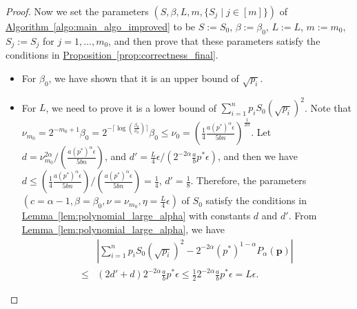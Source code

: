 \documentclass[journal]{IEEEtran}
\newcommand{\lem}[1]{\hyperref[lem:#1]{Lemma~\ref*{lem:#1}}}
\newcommand{\prop}[1]{\hyperref[prop:#1]{Proposition~\ref*{prop:#1}}}
\newcommand{\algo}[1]{\hyperref[algo:#1]{Algorithm~\ref*{algo:#1}}}
\begin{document}
\begin{proof}
    Now we set the parameters $(S, \beta,L,m,\{S_j\mid j\in[m]\})$ of \algo{main_algo_improved} to be $S:=S_0$, $\beta := \beta_0$, $L:=L$, $m:=m_0$, $S_j := S_j$ for $j = 1,\ldots,m_0$, and then prove that these parameters satisfy the conditions in \prop{correctness_final}.
    \begin{itemize}
        \item For $\beta_0$, we have shown that it is an upper bound of $\sqrt{p_i}$.
        \item For $L$, we need to prove it is a lower bound of $\sum_{i=1}^n p_i S_0(\sqrt{p_i})^2$. Note that $\nu_{m_0} = 2^{-m_0+1}\beta_0 = 2^{-\lceil \log(\frac{\beta_0}{\nu_0})\rceil}\beta_0 \le \nu_0 = \left(\frac{1}{4}\frac{a(p^*)^{\alpha}\epsilon}{5bn}\right)^{\frac{1}{2\alpha}}$. Let $d = \nu_{m_0}^{2\alpha}/\left(\frac{a(p^*)^{\alpha}\epsilon}{5bn}\right)$, and $d' = \frac{L}{4}\epsilon/(2^{-2\alpha}\frac{a}{b}p^*\epsilon)$, and then we have $d \le \left(\frac{1}{4}\frac{a(p^*)^{\alpha}\epsilon}{5bn}\right)/\left(\frac{a(p^*)^{\alpha}\epsilon}{5bn}\right) =  \frac{1}{4}$, $d' = \frac{1}{8}$. Therefore, the parameters $(c=\alpha-1,\beta=\beta_0,\nu=\nu_{m_0}, \eta = \frac{L}{4}\epsilon)$ of $S_0$ satisfy the conditions in \lem{polynomial_large_alpha} with constants $d$ and $d'$. From \lem{polynomial_large_alpha}, we have
        \begin{align}
        \label{eq:approximation_large_alpha_final}
            &\left|\sum_{i=1}^n p_iS_0(\sqrt{p_i})^2 -2^{-2\alpha}(p^*)^{1-\alpha}P_{\alpha}(\mathbf{p})\right| \nonumber \\ \le& (2d'+d)2^{-2\alpha}\frac{a}{b}p^*\epsilon \le \frac{1}{2}2^{-2\alpha}\frac{a}{b}p^*\epsilon = L\epsilon.
        \end{align}
    

\end{itemize}
\end{proof}
\end{document}
